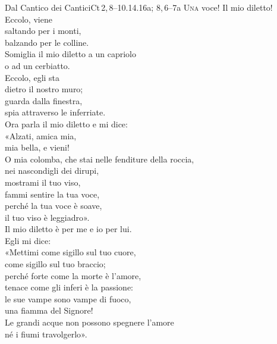 \documentclass[11pt]{book}
\begin{document}
\pagebreak
{}
\begin{lettura}{Dal Cantico dei Cantici}{Ct\,2,\,8--10.14.16a; 8,\,6--7a}
\lettrine[lines=3]{U}{na} voce! Il mio diletto!\\
Eccolo, viene\\
saltando per i monti,\\
balzando per le colline.\\
Somiglia il mio diletto a un capriolo\\
o ad un cerbiatto.\\
Eccolo, egli sta\\
dietro il nostro muro;\\
guarda dalla finestra,\\
spia attraverso le inferriate.\\

\noindent
Ora parla il mio diletto e mi dice:\\
«Alzati, amica mia,\\
mia bella, e vieni!\\
O mia colomba, che stai nelle fenditure della roccia,\\
nei nascondigli dei dirupi,\\
mostrami il tuo viso,\\
fammi sentire la tua voce,\\
perché la tua voce è soave,\\
il tuo viso è leggiadro».\\

\noindent
Il mio diletto è per me e io per lui.\\
Egli mi dice:\\
«Mettimi come sigillo sul tuo cuore,\\
come sigillo sul tuo braccio;\\
perché forte come la morte è l'amore,\\
tenace come gli inferi è la passione:\\
le sue vampe sono vampe di fuoco,\\
una fiamma del Signore!\\
Le grandi acque non possono spegnere l'amore\\
né i fiumi travolgerlo».\\
\end{lettura}

\pagebreak
\vspace{\baselineskip}
\renewcommand{\versettosalmo}{Il nostro Dio è grande nell'amore.}
\noindent{}
\end{document}
